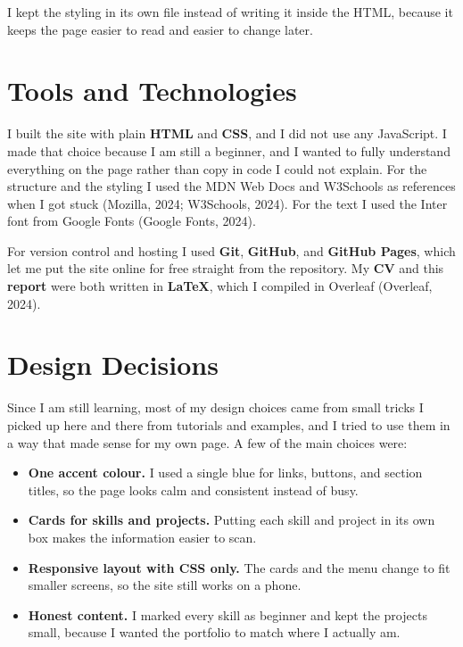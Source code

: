 \documentclass[11pt,a4paper]{article}
\begin{document}
I kept the styling in its own file instead of writing it inside the HTML, because it keeps
the page easier to read and easier to change later.

\section{Tools and Technologies}

I built the site with plain \textbf{HTML} and \textbf{CSS}, and I did not use any JavaScript.
I made that choice because I am still a beginner, and I wanted to fully understand everything
on the page rather than copy in code I could not explain. For the structure and the styling I
used the MDN Web Docs and W3Schools as references when I got stuck (Mozilla, 2024; W3Schools,
2024). For the text I used the Inter font from Google Fonts (Google Fonts, 2024).

For version control and hosting I used \textbf{Git}, \textbf{GitHub}, and \textbf{GitHub
Pages}, which let me put the site online for free straight from the repository. My
\textbf{CV} and this \textbf{report} were both written in \textbf{LaTeX}, which I compiled
in Overleaf (Overleaf, 2024).

\section{Design Decisions}

Since I am still learning, most of my design choices came from small tricks I picked up here
and there from tutorials and examples, and I tried to use them in a way that made sense for my
own page. A few of the main choices were:

\begin{itemize}[leftmargin=1.4em, itemsep=2pt, topsep=2pt]
  \item \textbf{One accent colour.} I used a single blue for links, buttons, and section
        titles, so the page looks calm and consistent instead of busy.
  \item \textbf{Cards for skills and projects.} Putting each skill and project in its own
        box makes the information easier to scan.
  \item \textbf{Responsive layout with CSS only.} The cards and the menu change to fit smaller
        screens, so the site still works on a phone.
  \item \textbf{Honest content.} I marked every skill as beginner and kept the projects small,
        because I wanted the portfolio to match where I actually am.
\end{itemize}
\end{document}
